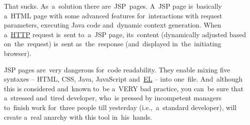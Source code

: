 \noindent That sucks.
As~a~solution there are~JSP~pages.
A~JSP page is~basically a~HTML page with some advanced features for~interactions with request parameters, executing Java code and~dynamic context generation.
When a~\hyperref[http]{HTTP} request is~sent to~a~JSP page, its~content (dynamically adjusted based on~the~request) is~sent as~the~response (and~displayed in~the~initiating browser).

\warning JSP pages are~very dangerous for~code readability.
They enable mixing five syntaxes -- HTML, CSS, Java, JavaScript and~\hyperref[el]{EL} -- into one~file.
And~although this is considered and~known to~be a~VERY bad practice, you can~be sure that a~stressed and~tired developer, who~is pressed by incompetent managers to~finish work for~three people till yesterday (i.e.,~a~standard developer), will create a~real anarchy with this tool in~his~hands.

\label{jstl}

\label{jspattributeparameter}


\label{el}
